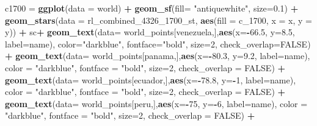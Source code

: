 \documentclass[12pt,twoside]{reedthesis}
\newenvironment{Shaded}{\begin{snugshade}}{\end{snugshade}}
\newcommand{\DataTypeTok}[1]{\textcolor[rgb]{0.13,0.29,0.53}{#1}}
\newcommand{\DecValTok}[1]{\textcolor[rgb]{0.00,0.00,0.81}{#1}}
\newcommand{\FloatTok}[1]{\textcolor[rgb]{0.00,0.00,0.81}{#1}}
\newcommand{\KeywordTok}[1]{\textcolor[rgb]{0.13,0.29,0.53}{\textbf{#1}}}
\newcommand{\NormalTok}[1]{#1}
\newcommand{\OperatorTok}[1]{\textcolor[rgb]{0.81,0.36,0.00}{\textbf{#1}}}
\newcommand{\OtherTok}[1]{\textcolor[rgb]{0.56,0.35,0.01}{#1}}
\newcommand{\StringTok}[1]{\textcolor[rgb]{0.31,0.60,0.02}{#1}}
\begin{document}
\begin{Shaded}
\begin{Highlighting}[]
\NormalTok{c1700 =}\StringTok{ }\KeywordTok{ggplot}\NormalTok{(}\DataTypeTok{data =}\NormalTok{ world) }\OperatorTok{+}\StringTok{ }
\StringTok{  }\KeywordTok{geom_sf}\NormalTok{(}\DataTypeTok{fill=} \StringTok{"antiquewhite"}\NormalTok{, }\DataTypeTok{size=}\FloatTok{0.1}\NormalTok{) }\OperatorTok{+}\StringTok{ }
\StringTok{  }\KeywordTok{geom_stars}\NormalTok{(}\DataTypeTok{data =}\NormalTok{ rl_combined_}\DecValTok{4326}\NormalTok{_}\DecValTok{1700}\NormalTok{_st, }\KeywordTok{aes}\NormalTok{(}\DataTypeTok{fill =}\NormalTok{ c_}\DecValTok{1700}\NormalTok{, }\DataTypeTok{x =}\NormalTok{ x, }\DataTypeTok{y =}\NormalTok{ y)) }\OperatorTok{+}\StringTok{ }
\StringTok{  }\NormalTok{sc}\OperatorTok{+}
\StringTok{  }\KeywordTok{geom_text}\NormalTok{(}\DataTypeTok{data=}\NormalTok{ world_points[venezuela,],}\KeywordTok{aes}\NormalTok{(}\DataTypeTok{x=}\OperatorTok{-}\FloatTok{66.5}\NormalTok{, }\DataTypeTok{y=}\FloatTok{8.5}\NormalTok{, }\DataTypeTok{label=}\NormalTok{name), }\DataTypeTok{color=}\StringTok{"darkblue"}\NormalTok{, }\DataTypeTok{fontface=}\StringTok{"bold"}\NormalTok{, }\DataTypeTok{size=}\DecValTok{2}\NormalTok{, }\DataTypeTok{check_overlap=}\OtherTok{FALSE}\NormalTok{) }\OperatorTok{+}
\StringTok{  }\KeywordTok{geom_text}\NormalTok{(}\DataTypeTok{data=}\NormalTok{ world_points[panama,],}\KeywordTok{aes}\NormalTok{(}\DataTypeTok{x=}\OperatorTok{-}\FloatTok{80.3}\NormalTok{, }\DataTypeTok{y=}\FloatTok{9.2}\NormalTok{, }\DataTypeTok{label=}\NormalTok{name), }\DataTypeTok{color =} \StringTok{"darkblue"}\NormalTok{, }\DataTypeTok{fontface =} \StringTok{"bold"}\NormalTok{, }\DataTypeTok{size=}\DecValTok{2}\NormalTok{, }\DataTypeTok{check_overlap =} \OtherTok{FALSE}\NormalTok{) }\OperatorTok{+}\StringTok{ }
\StringTok{  }\KeywordTok{geom_text}\NormalTok{(}\DataTypeTok{data=}\NormalTok{ world_points[ecuador,],}\KeywordTok{aes}\NormalTok{(}\DataTypeTok{x=}\OperatorTok{-}\FloatTok{78.8}\NormalTok{, }\DataTypeTok{y=}\OperatorTok{-}\DecValTok{1}\NormalTok{, }\DataTypeTok{label=}\NormalTok{name), }\DataTypeTok{color =} \StringTok{"darkblue"}\NormalTok{, }\DataTypeTok{fontface =} \StringTok{"bold"}\NormalTok{, }\DataTypeTok{size=}\DecValTok{2}\NormalTok{, }\DataTypeTok{check_overlap =} \OtherTok{FALSE}\NormalTok{) }\OperatorTok{+}
\StringTok{  }\KeywordTok{geom_text}\NormalTok{(}\DataTypeTok{data=}\NormalTok{ world_points[peru,],}\KeywordTok{aes}\NormalTok{(}\DataTypeTok{x=}\OperatorTok{-}\DecValTok{75}\NormalTok{, }\DataTypeTok{y=}\OperatorTok{-}\DecValTok{6}\NormalTok{, }\DataTypeTok{label=}\NormalTok{name), }\DataTypeTok{color =} \StringTok{"darkblue"}\NormalTok{, }\DataTypeTok{fontface =} \StringTok{"bold"}\NormalTok{, }\DataTypeTok{size=}\DecValTok{2}\NormalTok{, }\DataTypeTok{check_overlap =} \OtherTok{FALSE}\NormalTok{) }\OperatorTok{+}

\end{Highlighting}
\end{Shaded}
\end{document}
